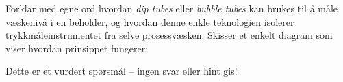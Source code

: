

Forklar med egne ord hvordan {\it dip tubes} eller {\it bubble tubes} kan brukes til å måle væskenivå i en beholder, og hvordan denne enkle teknologien isolerer trykkmåleinstrumentet fra selve prosessvæsken.  Skisser et enkelt diagram som viser hvordan prinsippet fungerer:

\vfil

\eject






Dette er et vurdert spørsmål -- ingen svar eller hint gis!









